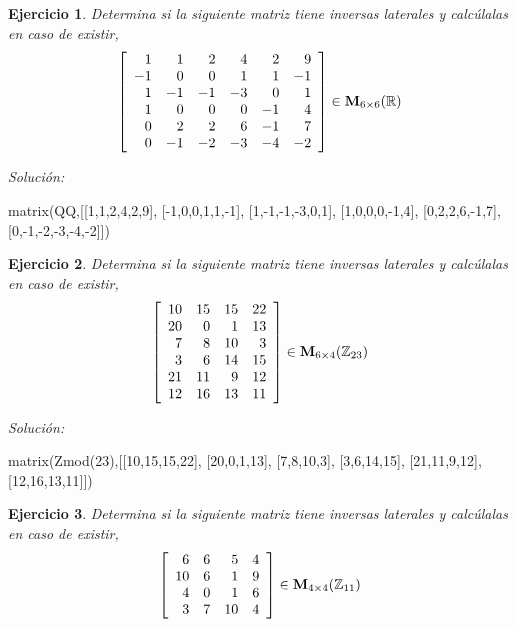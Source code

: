 \documentclass{amsart}
\newtheorem{ejer}{Ejercicio}
\begin{document}


\begin{ejer} Determina si la siguiente matriz tiene inversas laterales y calc\'ulalas en caso de existir,
\[ \left[\begin{array}{rrrrrr}
1 & 1 & 2 & 4 & 2 & 9 \\
-1 & 0 & 0 & 1 & 1 & -1 \\
1 & -1 & -1 & -3 & 0 & 1 \\
1 & 0 & 0 & 0 & -1 & 4 \\
0 & 2 & 2 & 6 & -1 & 7 \\
0 & -1 & -2 & -3 & -4 & -2
\end{array}\right] \in {\bf M}_{6\times 6}({\mathbb R})\]
\end{ejer}

{\it Soluci\'on:}

\begin{sageblock}
matrix(QQ,[[1,1,2,4,2,9],
[-1,0,0,1,1,-1],
[1,-1,-1,-3,0,1],
[1,0,0,0,-1,4],
[0,2,2,6,-1,7],
[0,-1,-2,-3,-4,-2]])
\end{sageblock}



\begin{ejer} Determina si la siguiente matriz tiene inversas laterales y calc\'ulalas en caso de existir,
\[ \left[\begin{array}{rrrr}
10 & 15 & 15 & 22 \\
20 & 0 & 1 & 13 \\
7 & 8 & 10 & 3 \\
3 & 6 & 14 & 15 \\
21 & 11 & 9 & 12 \\
12 & 16 & 13 & 11
\end{array}\right] \in {\bf M}_{6\times 4}({\mathbb Z}_{23})\]
\end{ejer}

{\it Soluci\'on:}

\begin{sageblock}
matrix(Zmod(23),[[10,15,15,22],
[20,0,1,13],
[7,8,10,3],
[3,6,14,15],
[21,11,9,12],
[12,16,13,11]])
\end{sageblock}



\begin{ejer} Determina si la siguiente matriz tiene inversas laterales y calc\'ulalas en caso de existir,
\[ \left[\begin{array}{rrrr}
6 & 6 & 5 & 4 \\
10 & 6 & 1 & 9 \\
4 & 0 & 1 & 6 \\
3 & 7 & 10 & 4
\end{array}\right] \in {\bf M}_{4\times 4}({\mathbb Z}_{11})\]
\end{ejer}
\end{document}
